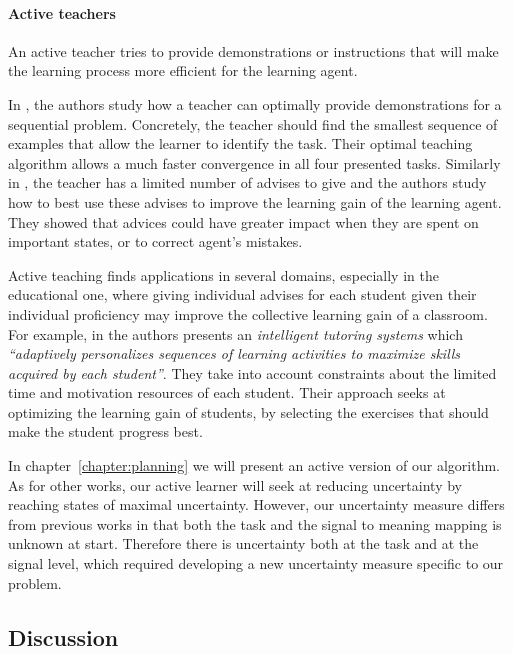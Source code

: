 \paragraph{Active teachers}

An active teacher tries to provide demonstrations or instructions that will make the learning process more efficient for the learning agent. 

In \cite{cakmak2012algorithmic}, the authors study how a teacher can optimally provide demonstrations for a sequential problem. Concretely, the teacher should find the smallest sequence of examples that allow the learner to identify the task. Their optimal teaching algorithm allows a much faster convergence in all four presented tasks. Similarly in \cite{torrey2013teaching}, the teacher has a limited number of advises to give and the authors study how to best use these advises to improve the learning gain of the learning agent. They showed that advices could have greater impact when they are spent on important states, or to correct agent's mistakes.

Active teaching finds applications in several domains, especially in the educational one, where giving individual advises for each student given their individual proficiency may improve the collective learning gain of a classroom. For example, in \cite{clement2014online} the authors presents an \emph{intelligent tutoring systems} which \textit{``adaptively personalizes sequences of learning activities to maximize skills acquired by each student''}. They take into account constraints about the limited time and motivation resources of each student. Their approach seeks at optimizing the learning gain of students, by selecting the exercises that should make the student progress best.
 
\transition

In chapter~\ref{chapter:planning} we will present an active version of our algorithm. As for other works, our active learner will seek at reducing uncertainty by reaching states of maximal uncertainty. However, our uncertainty measure differs from previous works in that both the task and the signal to meaning mapping is unknown at start. Therefore there is uncertainty both at the task and at the signal level, which required developing a new uncertainty measure specific to our problem.

\subsection{Discussion}

